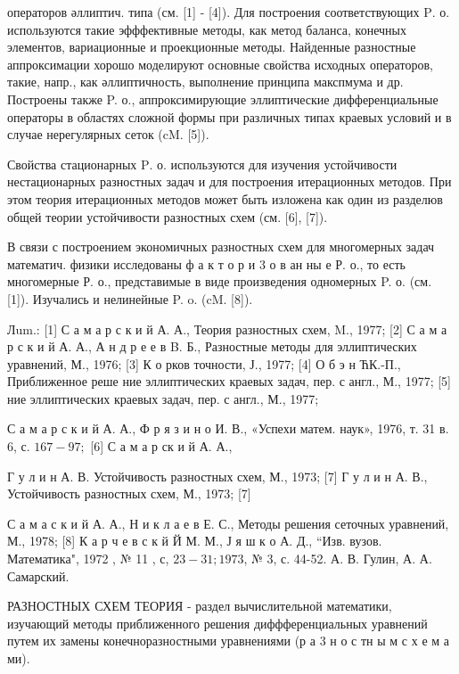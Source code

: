 \documentclass[10pt]{article}
\begin{document}
операторов әллиптич. типа (см. [1] - [4]). Для построения соответствующих $\mathrm{P}$. о. используются такие эфффективные методы, как метод баланса, конечных элементов, вариационные и проекционные методы. Найденные разностные аппроксимации хорошо моделируют основные свойства исходных операторов, такие, напр., как әллиптичность, выполнение принципа макспмума и др. Построены также P. о., аппроксимирующие эллиптические дифференциальные операторы в областях сложной формы при различных типах краевых условий и в случае нерегулярных сеток (cM. [5]).



Свойства стационарных $\mathrm{P}$. о. используются для изучения устойчивости нестационарных разностных задач и для построения итерационных методов. При этом теория итерационных методов может быть изложена как один из разделюв общей теории устойчивости разностных схем (см. [6], [7]).



В связи с построением экономичных разностных схем для многомерных задач математич. физики исследованы ф а к т о р и 3 о в ан ны е Р. о., то есть многомерные Р. о., представимые в виде произведения одномерных P. о. (см. [1]). Изучались и нелинейные P. o. (cM. [8]).



Лum.: [1] С а м а р с к и й А. А., Теория разностных схем, M., 1977; [2] С а м а р с к и й А. А., А н д р е е в B. Б., Разностные методы для эллиптических уравнений, М., 1976; [3] К о рков точности, Ј., 1977; [4] О б э н ЋК.-П., Приближенное реше ние эллиптических краевых задач, пер. с англ., М., 1977; [5] ние эллиптических краевых задач, пер. с англ., М., 1977;

С а м а р с к и й А. А., Ф р я з и н о И. В., «Успехи матем. наук», 1976, т. 31 в. 6, с. $167-97 ;$ [6] С а м а р ск и й А. А.,

Г у л и н А. В. Устойчивость разностных схем, М., 1973; [7] Г у л и н А. В., Устойчивость разностных схем, М., 1973; [7]

С а м а с к и й А. А., Н и к л а е в Е. С., Методы решения сеточных уравнений, М., 1978; [8] К а р ч е в с к й Й М. М., Ј я ш к о А. Д., “Изв. вузов. Математика", 1972 , № 11 , с, $23-31 ; 1973$, № 3, с. 44-52. А. В. Гулин, А. А. Самарский.



РАЗНОСТНЫХ СХЕМ ТЕОРИЯ - раздел вычислительной математики, изучающий методы приближенного решения диффференциальных уравнений путем их замены конечноразностными уравнениями (р а 3 н о с тн ы м с х е м а ми).
\end{document}
